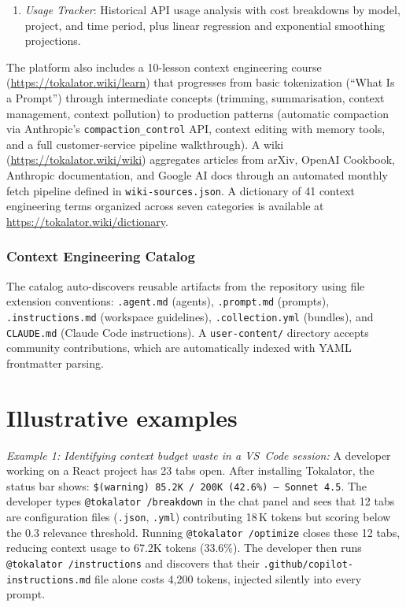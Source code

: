 \documentclass[a4paper,fleqn]{cas-dc}
\begin{document}
\begin{enumerate}
  The tool renders quality isoquant curves and cost minimization surfaces with and without caching.

  \item \textit{Usage Tracker}: Historical API usage analysis with cost breakdowns by model, project, and time period, plus linear regression and exponential smoothing projections.
\end{enumerate}

The platform also includes a 10-lesson context engineering course (\url{https://tokalator.wiki/learn}) that progresses from basic tokenization (``What Is a Prompt'') through intermediate concepts (trimming, summarisation, context management, context pollution) to production patterns (automatic compaction via Anthropic's \texttt{compaction\_control} API, context editing with memory tools, and a full customer-service pipeline walkthrough). A wiki (\url{https://tokalator.wiki/wiki}) aggregates articles from arXiv, OpenAI Cookbook, Anthropic documentation, and Google AI docs through an automated monthly fetch pipeline defined in \texttt{wiki-sources.json}. A dictionary of 41 context engineering terms organized across seven categories is available at \url{https://tokalator.wiki/dictionary}.

\subsubsection{Context Engineering Catalog}

The catalog auto-discovers reusable artifacts from the repository using file extension conventions: \texttt{.agent.md} (agents), \texttt{.prompt.md} (prompts), \texttt{.instructions.md} (workspace guidelines), \texttt{.collection.yml} (bundles), and \texttt{CLAUDE.md} (Claude Code instructions).
A \texttt{user-content/} directory accepts community contributions, which are automatically indexed with YAML frontmatter parsing.



\section{Illustrative examples}
\label{sec:examples}

\textit{Example 1: Identifying context budget waste in a VS~Code session:} A developer working on a React project has 23 tabs open.
After installing Tokalator, the status bar shows: \texttt{\$(warning) 85.2K / 200K (42.6\%) -- Sonnet 4.5}. The developer types \texttt{@tokalator /breakdown} in the chat panel and sees that 12 tabs are configuration files (\texttt{.json}, \texttt{.yml}) contributing 18\,K tokens but scoring below the 0.3 relevance threshold. Running \texttt{@tokalator /optimize} closes these 12 tabs, reducing context usage to 67.2K tokens (33.6\%). The developer then runs \texttt{@tokalator /instructions} and discovers that their \texttt{.github/copilot-instructions.md} file alone costs 4,200 tokens, injected silently into every prompt.
\end{document}
